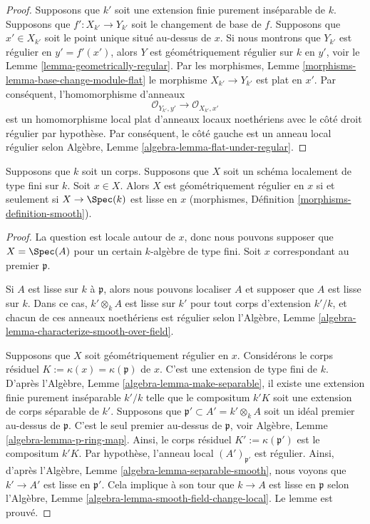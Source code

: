 \begin{proof}
Supposons que $k'$ soit une extension finie purement
inséparable de $k$. Supposons que $f' : X_{k'} \to
Y_{k'}$ soit le changement de base de $f$. Supposons que
$x' \in X_{k'}$ soit le point unique situé au-dessus de
$x$. Si nous montrons que $Y_{k'}$ est régulier en $y' =
f'(x')$, alors $Y$ est géométriquement régulier sur $k$
en $y'$, voir le Lemme
\ref{lemma-geometrically-regular}. Par les morphismes, Lemme
\ref{morphisms-lemma-base-change-module-flat} le morphisme $X_{k'}
\to Y_{k'}$ est plat en $x'$. Par conséquent, l'homomorphisme d'anneaux
$$
\mathcal{O}_{Y_{k'}, y'}
\longrightarrow
\mathcal{O}_{X_{k'}, x'}
$$
est un homomorphisme local plat d'anneaux locaux
noethériens avec le côté droit régulier par hypothèse. Par
conséquent, le côté gauche est un anneau local régulier
selon Algèbre, Lemme \ref{algebra-lemma-flat-under-regular}.
\end{proof}

\begin{lemma}
\label{lemma-geometrically-regular-smooth}
Supposons que $k$ soit un corps. Supposons que $X$
soit un schéma localement de type fini sur $k$. Soit $x
\in X$. Alors $X$ est géométriquement régulier en $x$
si et seulement si $X \to \Spec(k)$ est lisse en $x$
(morphismes, Définition \ref{morphisms-definition-smooth}).
\end{lemma}

\begin{proof}
La question est locale autour de $x$, donc
nous pouvons supposer que $X = \Spec(A)$
pour un certain $k$-algèbre de type fini.
Soit $x$ correspondant au premier $\mathfrak p$.

\medskip\noindent
Si $A$ est lisse sur $k$ à $\mathfrak p$, alors nous pouvons
localiser $A$ et supposer que $A$ est lisse sur $k$. Dans ce cas,
$k' \otimes_k A$ est lisse sur $k'$ pour tout corps d'extension
$k'/k$, et chacun de ces anneaux noethériens est régulier selon
l'Algèbre, Lemme \ref{algebra-lemma-characterize-smooth-over-field}.

\medskip\noindent
Supposons que $X$ soit géométriquement régulier en $x$.
Considérons le corps résiduel $K := \kappa(x) =
\kappa(\mathfrak p)$ de $x$. C'est une extension de type
fini de $k$. D'après l'Algèbre, Lemme
\ref{algebra-lemma-make-separable}, il existe une
extension finie purement inséparable $k'/k$ telle que le
compositum $k'K$ soit une extension de corps séparable de
$k'$. Supposons que $\mathfrak p' \subset A' = k'
\otimes_k A$ soit un idéal premier au-dessus de $\mathfrak
p$. C'est le seul premier au-dessus de $\mathfrak p$, voir
Algèbre, Lemme \ref{algebra-lemma-p-ring-map}. Ainsi, le
corps résiduel $K' := \kappa(\mathfrak p')$ est le
compositum $k'K$. Par hypothèse, l'anneau local
$(A')_{\mathfrak p'}$ est régulier. Ainsi, d'après l'Algèbre,
Lemme \ref{algebra-lemma-separable-smooth}, nous voyons que $k'
\to A'$ est lisse en $\mathfrak p'$. Cela implique à son tour
que $k \to A$ est lisse en $\mathfrak p$ selon l'Algèbre, Lemme
\ref{algebra-lemma-smooth-field-change-local}. Le lemme est prouvé.
\end{proof}


